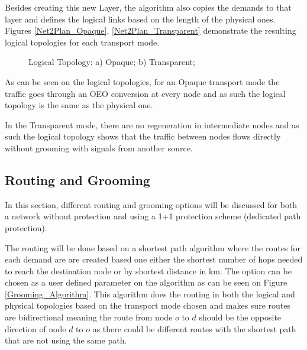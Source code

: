 \documentclass[12pt, a4paper]{article}
\begin{document}
	Besides creating this new Layer, the algorithm also copies the demands to that layer and defines the logical links based on the length of the physical ones.
	Figures \ref{Net2Plan_Opaque}, \ref{Net2Plan_Transparent}  demonstrate the resulting logical topologies for each transport mode.
	
			\begin{figure}[!h]
				\centering
				
				\caption{Logical Topology: a) Opaque; b) Transparent;}								
			\end{figure}	

	As can be seen on the logical topologies, for an Opaque transport mode the traffic goes through an OEO conversion at every node and as such the logical topology is the same as the physical one.
	
	In the Transparent mode, there are no regeneration in intermediate nodes and as such the logical topology shows that the traffic between nodes flows directly without grooming with signals from another source.
	
	\pagebreak
	\subsection{Routing and Grooming} \label{Routing and Grooming}
	
	\vspace{1cm}
	In this section, different routing and grooming options will be discussed for both a network without protection and using a 1+1 protection scheme (dedicated path protection).
		
	The routing will be done based on a shortest path algorithm where the routes for each demand are are created based one either the shortest number of hops needed to reach the destination node or by shortest distance in km. The option can be chosen as a user defined parameter on the algorithm as can be seen on Figure \ref{Grooming_Algorithm}. This algorithm does the routing in both the logical and physical topologies based on the transport mode chosen and makes sure routes are bidirectional meaning the route from node $o$ to $d$ should be the opposite direction of node $d$ to $o$ as there could be different routes with the shortest path that are not using the same path.
	
\end{document}
